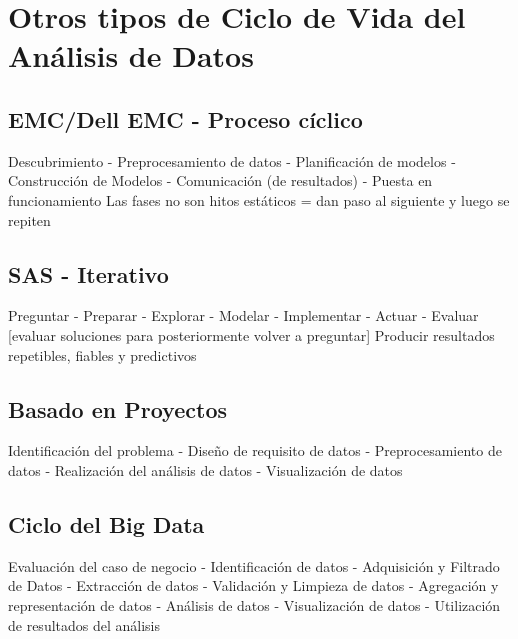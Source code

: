 \section{Otros tipos de Ciclo de Vida del Análisis de Datos}
\subsection{EMC/Dell EMC - Proceso cíclico}
Descubrimiento - Preprocesamiento de datos - Planificación de modelos - Construcción de Modelos - Comunicación (de resultados) - Puesta en funcionamiento
Las fases no son hitos estáticos = dan paso al siguiente y luego se repiten

\subsection{SAS - Iterativo}
Preguntar - Preparar - Explorar - Modelar - Implementar - Actuar - Evaluar [evaluar soluciones para posteriormente volver a preguntar]
Producir resultados repetibles, fiables y predictivos

\subsection{Basado en Proyectos}
Identificación del problema - Diseño de requisito de datos - Preprocesamiento de datos - Realización del análisis de datos - Visualización de datos 

\subsection{Ciclo del Big Data}
Evaluación del caso de negocio - Identificación de datos - Adquisición y Filtrado de Datos - Extracción de datos - Validación y Limpieza de datos - Agregación y representación de datos - Análisis de datos - Visualización de datos - Utilización de resultados del análisis